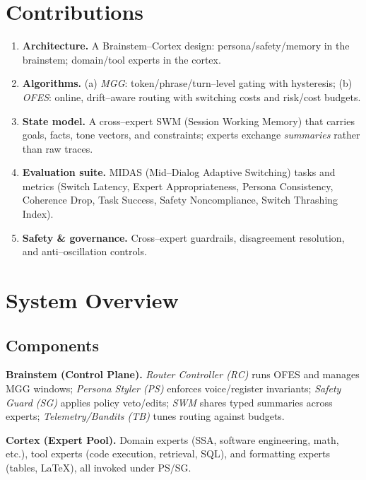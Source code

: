 \documentclass[11pt]{article}
\newcommand{\SWM}{\textsc{SWM}}
\begin{document}
\section{Contributions}
\begin{enumerate}[leftmargin=*,itemsep=2pt,topsep=2pt]
\item \textbf{Architecture.} A Brainstem--Cortex design: persona/safety/memory in the brainstem; domain/tool experts in the cortex.
\item \textbf{Algorithms.} (a) \emph{MGG}: token/phrase/turn--level gating with hysteresis; (b) \emph{OFES}: online, drift--aware routing with switching costs and risk/cost budgets.
\item \textbf{State model.} A cross--expert \SWM{} (Session Working Memory) that carries goals, facts, tone vectors, and constraints; experts exchange \emph{summaries} rather than raw traces.
\item \textbf{Evaluation suite.} MIDAS (Mid--Dialog Adaptive Switching) tasks and metrics (Switch Latency, Expert Appropriateness, Persona Consistency, Coherence Drop, Task Success, Safety Noncompliance, Switch Thrashing Index).
\item \textbf{Safety \& governance.} Cross--expert guardrails, disagreement resolution, and anti--oscillation controls.
\end{enumerate}

\section{System Overview}
\subsection{Components}
\textbf{Brainstem (Control Plane).} \emph{Router Controller (RC)} runs OFES and manages MGG windows; \emph{Persona Styler (PS)} enforces voice/register invariants; \emph{Safety Guard (SG)} applies policy veto/edits; \emph{\SWM} shares typed summaries across experts; \emph{Telemetry/Bandits (TB)} tunes routing against budgets.

\textbf{Cortex (Expert Pool).} Domain experts (SSA, software engineering, math, etc.), tool experts (code execution, retrieval, SQL), and formatting experts (tables, LaTeX), all invoked under PS/SG.
\end{document}
